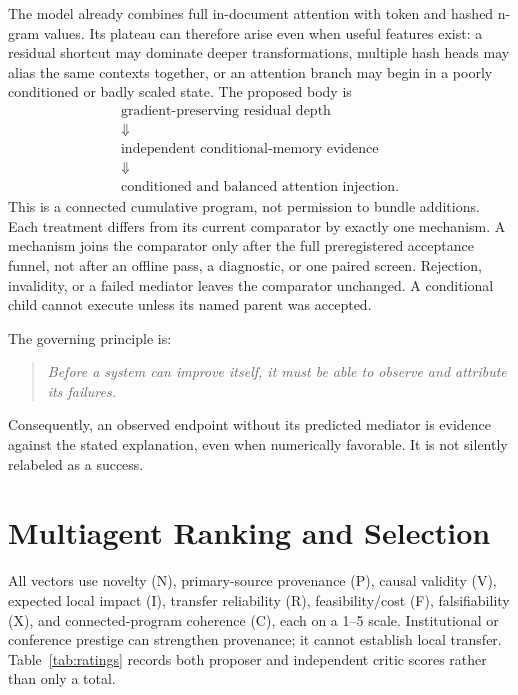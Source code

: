 \documentclass{article}
\begin{document}
The model already combines full in-document attention with token and
hashed n-gram values.  Its plateau can therefore arise even when useful
features exist: a residual shortcut may dominate deeper transformations,
multiple hash heads may alias the same contexts together, or an attention
branch may begin in a poorly conditioned or badly scaled state.  The proposed
body is
\[
\begin{gathered}
\text{gradient-preserving residual depth}\\
\Downarrow\\
\text{independent conditional-memory evidence}\\
\Downarrow\\
\text{conditioned and balanced attention injection}.
\end{gathered}
\]
This is a connected cumulative program, not permission to bundle additions.
Each treatment differs from its current comparator by exactly one mechanism.
A mechanism joins the comparator only after the full preregistered acceptance
funnel, not after an offline pass, a diagnostic, or one paired screen.
Rejection, invalidity, or a failed mediator leaves the comparator unchanged.
A conditional child cannot execute unless its named parent was accepted.

The governing principle is:
\begin{quote}
\emph{Before a system can improve itself, it must be able to observe and
attribute its failures.}
\end{quote}
Consequently, an observed endpoint without its predicted mediator is evidence
against the stated explanation, even when numerically favorable.  It is not
silently relabeled as a success.

\section{Multiagent Ranking and Selection}

All vectors use novelty (N), primary-source provenance (P), causal validity
(V), expected local impact (I), transfer reliability (R), feasibility/cost
(F), falsifiability (X), and connected-program coherence (C), each on a
1--5 scale.  Institutional or conference prestige can strengthen provenance;
it cannot establish local transfer.  Table~\ref{tab:ratings} records both
proposer and independent critic scores rather than only a total.
\end{document}
